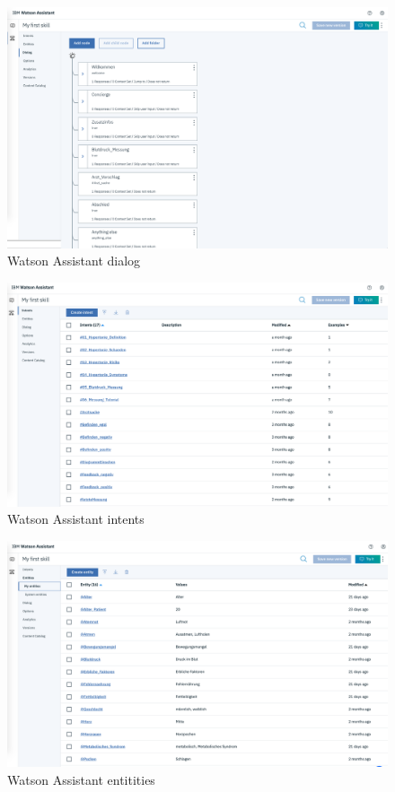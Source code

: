 \begin{figure}[h]
	\centering
	\includegraphics[width=1\textwidth]{images/WA_dialog.png}
	\caption{Watson Assistant dialog}
	\label{wa_dialog}
\end{figure}

\begin{figure}[h]
	\centering
	\includegraphics[width=1\textwidth]{images/WA_intents.png}
	\caption{Watson Assistant intents}
	\label{wa_intents}
\end{figure}

\begin{figure}[h]
	\centering
	\includegraphics[width=1\textwidth]{images/WA_entities.png}
	\caption{Watson Assistant entitities}
	\label{wa_entities}
\end{figure}


